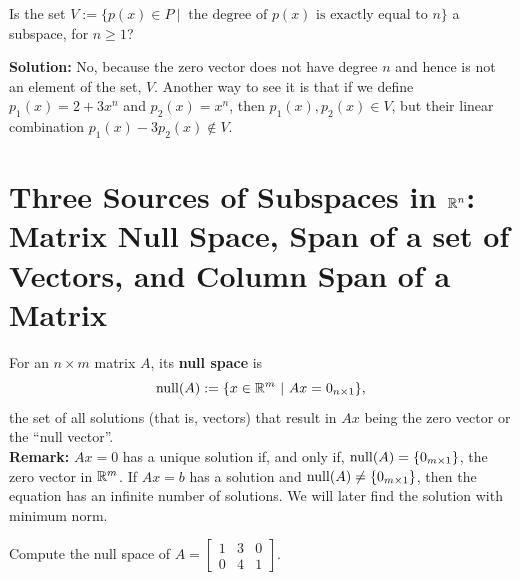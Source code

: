 \begin{example} Is the set $V:=\{ p(x) \in P~|~ \text{ the degree of }p(x) \text{ is exactly equal to }n \}$ a subspace, for $n\ge 1$?     
\end{example}

\textbf{Solution:} No, because the zero vector does not have degree $n$ and hence is not an element of the set, $V$. Another way to see it is that if we define $p_1(x) = 2 +  3 x^n$ and $p_2(x)= x^n$, then $p_1(x), p_2(x) \in V$, but their linear combination $p_1(x) - 3 p_2(x) \not \in V$.

\Qed

\section{Three Sources of Subspaces in $\mathbb R^n$: Matrix Null Space, Span of a set of Vectors, and Column Span of a Matrix}

\begin{tcolorbox}[sharp corners, colback=green!30, colframe=green!80!blue, title=\textbf{\Large Null Space of a Matrix}]
For an $n \times m$ matrix $A$, its \textbf{null space} is $$\mathrm{null}(A):=\{x \in \mathbb R^m~|~ A x = 0_{n \times 1} \},$$
the set of all solutions (that is, vectors) that result in $Ax$ being the zero vector or the ``null vector''. \\

\textbf{Remark:} $Ax=0$ has a unique solution if, and only if, $\mathrm{null}(A)=\{ 0_{m \times 1} \}$, the zero vector in $\mathbb R^m$. If $Ax=b$ has a solution and $\mathrm{null}(A) \neq \{ 0_{m \times 1} \}$, then the equation has an infinite number of solutions. We will later find the solution with minimum norm.

\end{tcolorbox}

\vspace*{.2cm}

\begin{example}
\label{ex:NullSpaceComputitingIt} 
Compute the null space of $A= \left[\begin{array}{ccc} 1 & 3 & 0\\
0 & 4 &  1\end{array}\right]$.

 \end{example}

